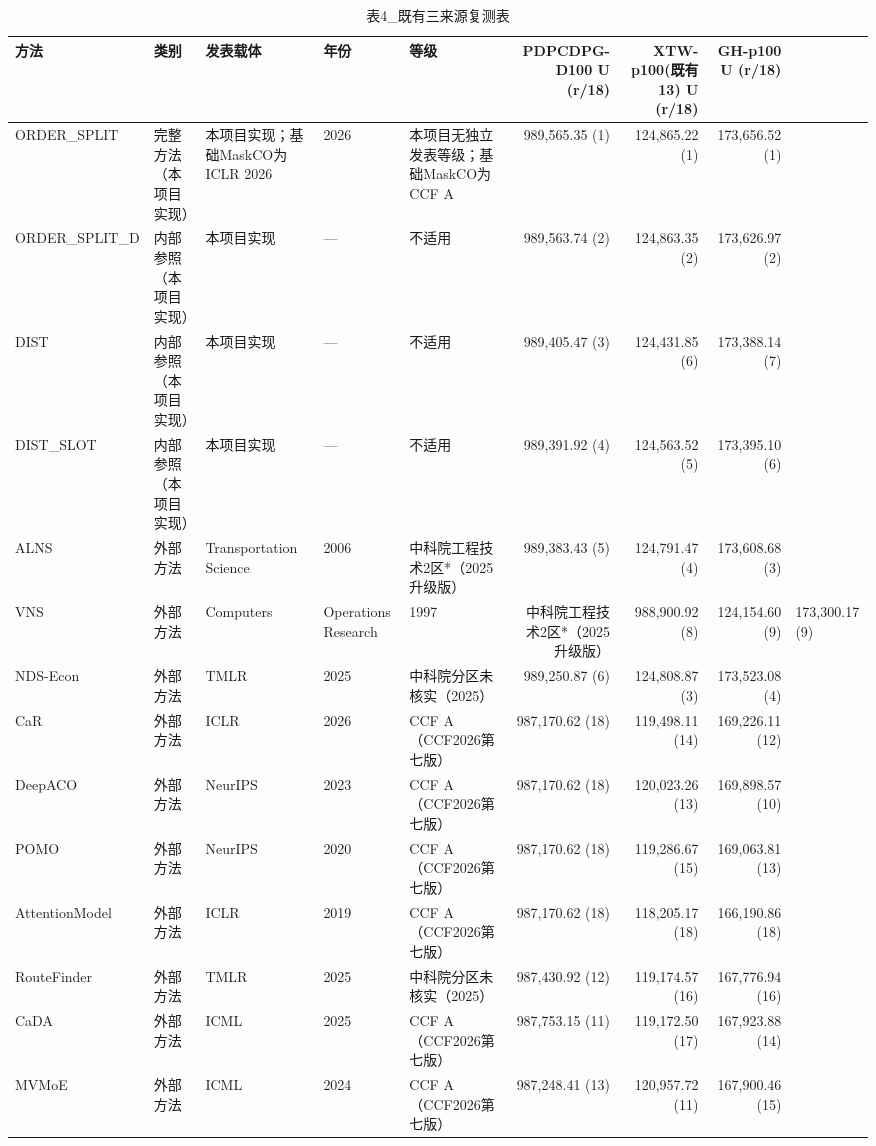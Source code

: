 \begin{table}[t]
\centering
\caption{表4_既有三来源复测表}
\label{tab:表4_既有三来源复测表}
\begin{tabular}{lllllrrr}
\toprule
方法 & 类别 & 发表载体 & 年份 & 等级 & PDPCDPG-D100 U (r/18) & XTW-p100(既有13) U (r/18) & GH-p100 U (r/18) \\
\midrule
ORDER_SPLIT & 完整方法（本项目实现） & 本项目实现；基础MaskCO为ICLR 2026 & 2026 & 本项目无独立发表等级；基础MaskCO为CCF A & 989,565.35 (1) & 124,865.22 (1) & 173,656.52 (1) \\
ORDER_SPLIT_D & 内部参照（本项目实现） & 本项目实现 & — & 不适用 & 989,563.74 (2) & 124,863.35 (2) & 173,626.97 (2) \\
DIST & 内部参照（本项目实现） & 本项目实现 & — & 不适用 & 989,405.47 (3) & 124,431.85 (6) & 173,388.14 (7) \\
DIST_SLOT & 内部参照（本项目实现） & 本项目实现 & — & 不适用 & 989,391.92 (4) & 124,563.52 (5) & 173,395.10 (6) \\
ALNS & 外部方法 & Transportation Science & 2006 & 中科院工程技术2区*（2025升级版） & 989,383.43 (5) & 124,791.47 (4) & 173,608.68 (3) \\
VNS & 外部方法 & Computers & Operations Research & 1997 & 中科院工程技术2区*（2025升级版） & 988,900.92 (8) & 124,154.60 (9) & 173,300.17 (9) \\
NDS-Econ & 外部方法 & TMLR & 2025 & 中科院分区未核实（2025） & 989,250.87 (6) & 124,808.87 (3) & 173,523.08 (4) \\
CaR & 外部方法 & ICLR & 2026 & CCF A（CCF2026第七版） & 987,170.62 (18) & 119,498.11 (14) & 169,226.11 (12) \\
DeepACO & 外部方法 & NeurIPS & 2023 & CCF A（CCF2026第七版） & 987,170.62 (18) & 120,023.26 (13) & 169,898.57 (10) \\
POMO & 外部方法 & NeurIPS & 2020 & CCF A（CCF2026第七版） & 987,170.62 (18) & 119,286.67 (15) & 169,063.81 (13) \\
AttentionModel & 外部方法 & ICLR & 2019 & CCF A（CCF2026第七版） & 987,170.62 (18) & 118,205.17 (18) & 166,190.86 (18) \\
RouteFinder & 外部方法 & TMLR & 2025 & 中科院分区未核实（2025） & 987,430.92 (12) & 119,174.57 (16) & 167,776.94 (16) \\
CaDA & 外部方法 & ICML & 2025 & CCF A（CCF2026第七版） & 987,753.15 (11) & 119,172.50 (17) & 167,923.88 (14) \\
MVMoE & 外部方法 & ICML & 2024 & CCF A（CCF2026第七版） & 987,248.41 (13) & 120,957.72 (11) & 167,900.46 (15) \\

\end{tabular}
\end{table}
